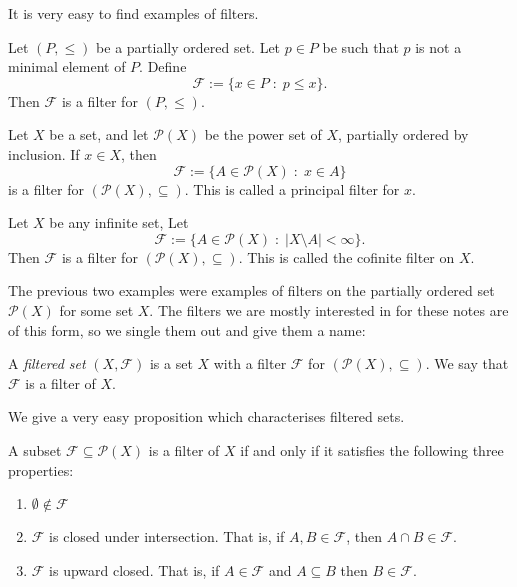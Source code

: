 It is very easy to find examples of filters.
\begin{example}
    Let $(P,\leq)$ be a partially ordered set. Let $p \in P$ be such
    that $p$ is not a minimal element of $P$. Define
    \begin{equation*}
        \mathcal{F} := \{x \in P\;:\; p\leq x\}.
    \end{equation*}    
    Then $\mathcal{F}$ is a filter for $(P,\leq)$.
\end{example}
\begin{example}
    Let $X$ be a set, and let $\mathcal{P}(X)$ be the power set
    of $X$, partially ordered by inclusion. If $x \in X$, then
    \begin{equation*}
        \mathcal{F} := \{ A \in \mathcal{P}(X)\;:\; x \in A\}
    \end{equation*}
    is a filter for $(\mathcal{P}(X),\subseteq)$. This is called a principal
    filter for $x$.\\

\end{example}
\begin{example}
    Let $X$ be any infinite set, Let 
    \begin{equation*}
        \mathcal{F} := \{ A \in \mathcal{P}(X)\;:\;|X\setminus A| < \infty\}.
    \end{equation*}
    Then $\mathcal{F}$ is a filter for $(\mathcal{P}(X),\subseteq)$. This
    is called the cofinite filter on $X$.
\end{example}

The previous two examples were examples of filters on the partially ordered
set $\mathcal{P}(X)$ for some set $X$. The filters we are mostly
interested in for these notes are of this form, so we single
them out and give them a name:
\begin{definition}
    A \emph{filtered set} $(X,\mathcal{F})$ is a set $X$
    with a filter $\mathcal{F}$ for $(\mathcal{P}(X),\subseteq)$. 
    We say that $\mathcal{F}$ is a filter of $X$.
\end{definition}

We give a very easy proposition which characterises filtered sets.
\begin{proposition}
    A subset $\mathcal{F} \subseteq \mathcal{P}(X)$ is a filter of $X$
    if and only if it satisfies the following three properties:
    \begin{enumerate}
    \item{} $\emptyset \notin \mathcal{F}$
    \item{} $\mathcal{F}$ is closed under intersection. That is, if $A,B\in \mathcal{F}$,
    then $A \cap B \in \mathcal{F}$.
    \item{} $\mathcal{F}$ is upward closed. That is, if $A \in \mathcal{F}$
    and $A \subseteq B$ then $B \in \mathcal{F}$.
    \end{enumerate}
\end{proposition}

